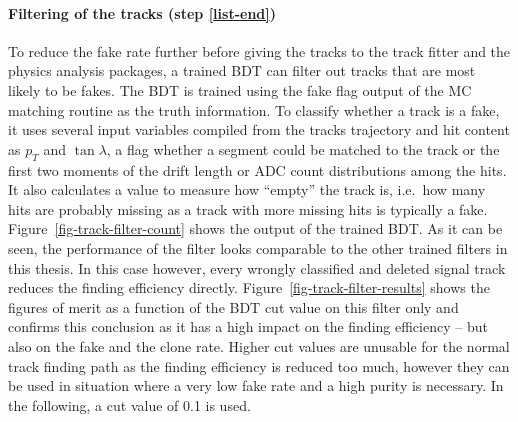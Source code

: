 
\paragraph{Filtering of the tracks (step \ref{list-end})}
To reduce the fake rate further before giving the tracks to the track fitter and the physics analysis packages, a trained BDT can filter out tracks that are most likely to be fakes. The BDT is trained using the fake flag output of the MC matching routine as the truth information. To classify whether a track is a fake, it uses several input variables compiled from the tracks trajectory and hit content as $p_T$ and $\tan \lambda$, a flag whether a segment could be matched to the track or the first two moments of the drift length or ADC count distributions among the hits. It also calculates a value to measure how ``empty'' the track is, i.e.\ how many hits are probably missing as a track with more missing hits is typically a fake. Figure~\ref{fig-track-filter-count} shows the output of the trained BDT. As it can be seen, the performance of the filter looks comparable to the other trained filters in this thesis. In this case however, every wrongly classified and deleted signal track reduces the finding efficiency directly. Figure~\ref{fig-track-filter-results} shows the figures of merit as a function of the BDT cut value on this filter only and confirms this conclusion as it has a high impact on the finding efficiency -- but also on the fake and the clone rate.
Higher cut values are unusable for the normal track finding path as the finding efficiency is reduced too much, however they can be used in situation where a very low fake rate and a high purity is necessary. In the following, a cut value of 0.1 is used.

